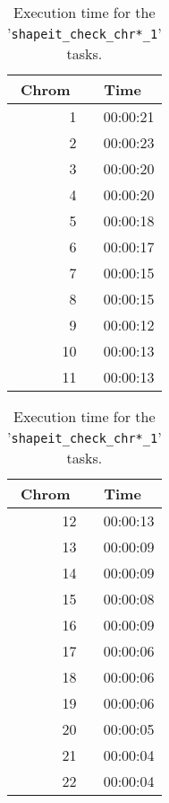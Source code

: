 \documentclass[10pt,twoside,english]{scrartcl}
\begin{document}
\begin{table}[H]
\protect\caption{Execution time for the '\texttt{shapeit\_check\_chr*\_1}' tasks.\label{tab:shapeit_check_1_exec_time}}

\centering

\begin{tabular}{rr}
\hline 
\multicolumn{1}{c}{\textbf{Chrom}}
 & \multicolumn{1}{c}{\textbf{Time}}
\\
\hline 

1 & {\color{light_gray}00:00:}21\\
2 & {\color{light_gray}00:00:}23\\
3 & {\color{light_gray}00:00:}20\\
4 & {\color{light_gray}00:00:}20\\
5 & {\color{light_gray}00:00:}18\\
6 & {\color{light_gray}00:00:}17\\
7 & {\color{light_gray}00:00:}15\\
8 & {\color{light_gray}00:00:}15\\
9 & {\color{light_gray}00:00:}12\\
10 & {\color{light_gray}00:00:}13\\
11 & {\color{light_gray}00:00:}13\\
\hline 
\end{tabular}
\hspace{1cm}
\begin{tabular}{rr}
\hline 
\multicolumn{1}{c}{\textbf{Chrom}}
 & \multicolumn{1}{c}{\textbf{Time}}
\\
\hline 

12 & {\color{light_gray}00:00:}13\\
13 & {\color{light_gray}00:00:0}9\\
14 & {\color{light_gray}00:00:0}9\\
15 & {\color{light_gray}00:00:0}8\\
16 & {\color{light_gray}00:00:0}9\\
17 & {\color{light_gray}00:00:0}6\\
18 & {\color{light_gray}00:00:0}6\\
19 & {\color{light_gray}00:00:0}6\\
20 & {\color{light_gray}00:00:0}5\\
21 & {\color{light_gray}00:00:0}4\\
22 & {\color{light_gray}00:00:0}4\\
\hline 
\end{tabular}


\end{table}
\end{document}
